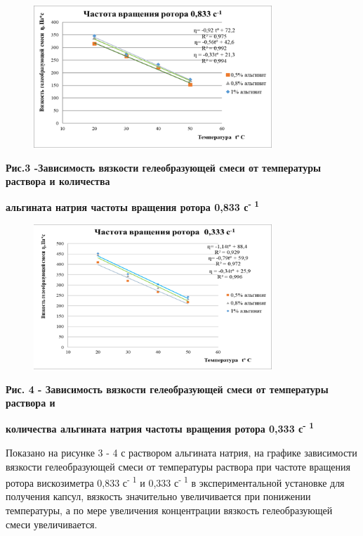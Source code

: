 \begin{figure}[H]
	\centering
	\includegraphics[width=0.8\textwidth]{assets/312}
	\caption*{}
\end{figure}

{\bfseries Рис.3 -Зависимость вязкости гелеобразующей смеси от температуры
раствора и количества}

{\bfseries альгината натрия частоты вращения ротора 0,833
с\textsuperscript{- 1}}

\begin{figure}[H]
	\centering
	\includegraphics[width=0.8\textwidth]{assets/313}
	\caption*{}
\end{figure}

{\bfseries Рис. 4 - Зависимость вязкости гелеобразующей смеси от
температуры раствора и}

{\bfseries количества альгината натрия частоты вращения ротора 0,333
с\textsuperscript{- 1}}

Показано на рисунке 3 - 4 с раствором альгината натрия, на графике
зависимости вязкости гелеобразующей смеси от температуры раствора при
частоте вращения ротора вискозиметра 0,833 с\textsuperscript{- 1} и
0,333 с\textsuperscript{- 1} в экспериментальной установке для получения
капсул, вязкость значительно увеличивается при понижении температуры, а
по мере увеличения концентрации вязкость гелеобразующей смеси
увеличивается.

